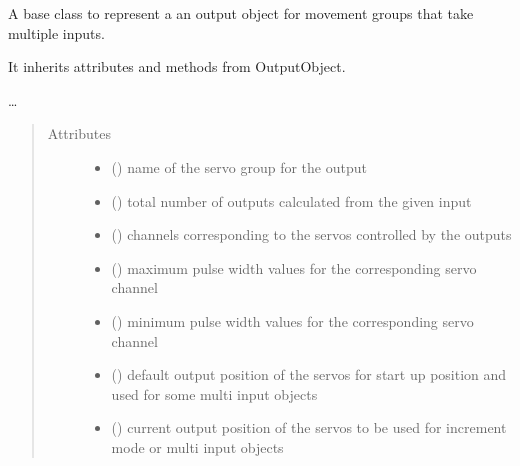 \documentclass[letterpaper,10pt,english]{sphinxmanual}
\begin{document}
\begin{fulllineitems}
\label{\detokenize{base:MultiInputOutputObject.MultiInputOutputObject}}
\sphinxAtStartPar
A base class to represent a an output object for movement groups 
that take multiple inputs.

\sphinxAtStartPar
It inherits attributes and methods from OutputObject.

\sphinxAtStartPar
…
\begin{quote}\begin{description}
\item[{Attributes}] \leavevmode\begin{itemize}
\item {} 
\sphinxAtStartPar
{}() \textendash{} name of the servo group for the output

\item {} 
\sphinxAtStartPar
{}() \textendash{} total number of outputs 
calculated from the given input

\item {} 
\sphinxAtStartPar
{}(\sphinxstyleemphasis{{[}int{]}}) \textendash{} channels corresponding to 
the servos controlled by the outputs

\item {} 
\sphinxAtStartPar
{}(\sphinxstyleemphasis{{[}int{]}}) \textendash{} maximum pulse width values 
for the corresponding servo channel

\item {} 
\sphinxAtStartPar
{}(\sphinxstyleemphasis{{[}int{]}}) \textendash{} minimum pulse width values 
for the corresponding servo channel

\item {} 
\sphinxAtStartPar
{}(\sphinxstyleemphasis{{[}int{]}}) \textendash{} default output position of 
the servos for start up position and used for some multi input 
objects

\item {} 
\sphinxAtStartPar
{}(\sphinxstyleemphasis{{[}int{]}}) \textendash{} current output position of the 
servos to be used for increment mode or multi input objects


\end{itemize}
\end{description}
\end{quote}
\end{fulllineitems}
\end{document}
